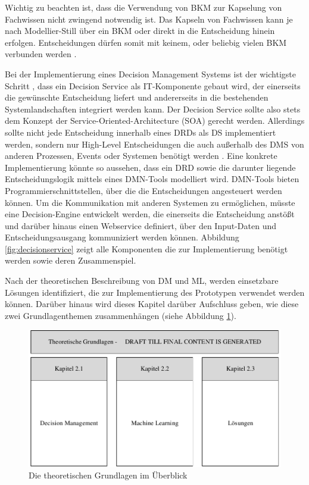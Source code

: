 Wichtig zu beachten ist, dass die Verwendung von BKM zur Kapselung von Fachwissen nicht zwingend notwendig ist. Das Kapseln von Fachwissen kann je nach Modellier-Still über ein BKM oder direkt in die Entscheidung hinein erfolgen. Entscheidungen dürfen somit mit keinem, oder beliebig vielen BKM verbunden werden \cite[vgl. S. 60]{OM16}.

Bei der Implementierung eines Decision Management Systems ist der wichtigste Schritt \cite[vgl. S. 115]{JT11}, dass ein Decision Service als IT-Komponente gebaut wird, der einerseits die gewünschte Entscheidung liefert und andererseits in die bestehenden Systemlandschaften integriert werden kann. Der Decision Service sollte also stets dem Konzept der Service-Oriented-Architecture (SOA) gerecht werden. Allerdings sollte nicht jede Entscheidung innerhalb eines DRDs als DS implementiert werden, sondern nur High-Level Entscheidungen die auch außerhalb des DMS von anderen Prozessen, Events oder Systemen benötigt werden \cite[vgl. S. 116]{JT11}. Eine konkrete Implementierung könnte so aussehen, dass ein DRD sowie die darunter liegende Entscheidungslogik mittels eines DMN-Tools modelliert wird. DMN-Tools bieten Programmierschnittstellen, über die die Entscheidungen angesteuert werden können. Um die Kommunikation mit anderen Systemen zu ermöglichen, müsste eine Decision-Engine \cite[vgl. S. 41]{BR16} entwickelt werden, die einerseits die Entscheidung anstößt und darüber hinaus einen Webservice definiert, über den Input-Daten und Entscheidungsausgang kommuniziert werden können. Abbildung \ref{fig:decisionservice} zeigt alle Komponenten die zur Implementierung benötigt werden sowie deren Zusammenspiel.


Nach der theoretischen Beschreibung von DM und ML, werden einsetzbare Lösungen identifiziert,  die zur Implementierung des Prototypen verwendet werden können. Darüber hinaus wird dieses Kapitel darüber Aufschluss geben, wie diese zwei Grundlagenthemen zusammenhängen (siehe Abbildung \ref{fig:Grundlagenpic}).     

\begin{figure}[ht]
\centering
\includegraphics{images/grundlagentheo.pdf}
\caption{Die theoretischen Grundlagen im Überblick}
\label{fig:Grundlagenpic}
\end{figure}

